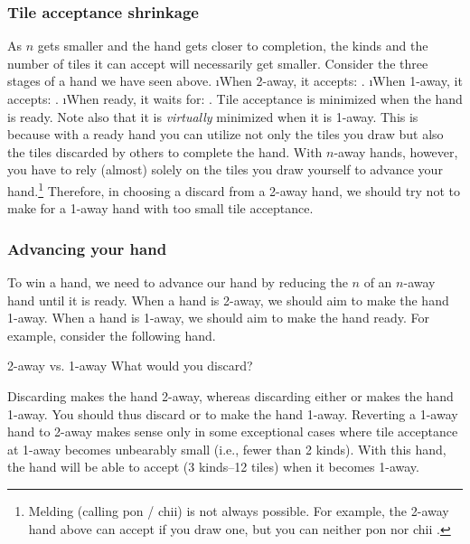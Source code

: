 \subsubsection{Tile acceptance shrinkage} 
As $n$ gets smaller and the hand gets closer to completion, the kinds and the number of tiles it can accept will necessarily get smaller. Consider the three stages of a hand we have seen above.
\bi
\i When 2-away, it accepts: {\LARGE{}}.
\i When 1-away, it accepts: {\LARGE{}}.
\i When ready, it waits for: {\LARGE{}}.
\ei
Tile acceptance is minimized when the hand is ready. Note also that it is \emph{virtually} minimized when it is 1-away. This is because with a ready hand you can utilize not only the tiles you draw but also the tiles discarded by others to complete the hand. With $n$-away hands, however, you have to rely (almost) solely on the tiles you draw yourself to advance your hand.\footnote{Melding (calling {\jap pon} / {\jap chii}) is not always possible. For example, the 2-away hand above can accept  if you draw one, but you can neither {\jap pon} nor {\jap chii} .} 
Therefore, in choosing a discard from a 2-away hand, we should try not to make for a 1-away hand with too small tile acceptance.

\subsubsection{Advancing your hand}

To win a hand, we need to advance our hand by reducing the $n$ of an $n$-away hand until it is ready.
When a hand is 2-away, we should aim to make the hand 1-away. 
When a hand is 1-away, we should aim to make the hand ready. 
For example, consider the following hand. 
\begin{itembox}[r]{2-away vs. 1-away}
\bp
{}\fa\fa\fa
\ep
\vspace{-10pt}What would you discard? \vspace{-5pt}
\end{itembox}
\noindent
Discarding {\LARGE{}} makes the hand 2-away, whereas discarding either {\LARGE{}} or {\LARGE{}} makes the hand 1-away. You should thus discard {\LARGE{}} or {\LARGE{}} to make the hand 1-away. 
Reverting a 1-away hand to 2-away makes sense only in some exceptional cases where tile acceptance at 1-away becomes unbearably small (i.e., fewer than 2 kinds).
With this hand, the hand will be able to accept {\LARGE{}} (3 kinds--12 tiles) when it becomes 1-away.

